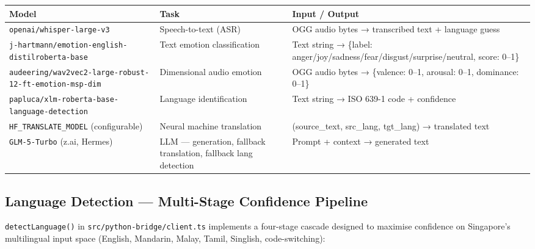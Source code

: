 \documentclass[12pt,a4paper]{article}
\begin{document}
\begin{longtable}{@{}p{4.5cm}p{4cm}p{6cm}@{}}
\toprule
\textbf{Model} & \textbf{Task} & \textbf{Input / Output} \\
\midrule
\endhead
\texttt{openai/whisper-large-v3} & Speech-to-text (ASR) & OGG audio bytes → transcribed text + language guess \\
\addlinespace
\texttt{j-hartmann/emotion-english-distilroberta-base} & Text emotion classification & Text string → \{label: anger/joy/sadness/fear/disgust/surprise/neutral, score: 0–1\} \\
\addlinespace
\texttt{audeering/wav2vec2-large-robust-12-ft-emotion-msp-dim} & Dimensional audio emotion & OGG audio bytes → \{valence: 0–1, arousal: 0–1, dominance: 0–1\} \\
\addlinespace
\texttt{papluca/xlm-roberta-base-language-detection} & Language identification & Text string → ISO 639-1 code + confidence \\
\addlinespace
\texttt{HF\_TRANSLATE\_MODEL} (configurable) & Neural machine translation & (source\_text, src\_lang, tgt\_lang) → translated text \\
\addlinespace
\texttt{GLM-5-Turbo} (z.ai, Hermes) & LLM — generation, fallback translation, fallback lang detection & Prompt + context → generated text \\
\bottomrule
\end{longtable}

\subsection{Language Detection — Multi-Stage Confidence Pipeline}

\texttt{detectLanguage()} in \texttt{src/python-bridge/client.ts} implements a
four-stage cascade designed to maximise confidence on Singapore's multilingual
input space (English, Mandarin, Malay, Tamil, Singlish, code-switching):
\end{document}
